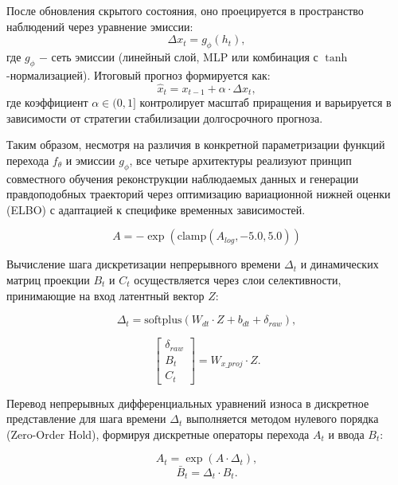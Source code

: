 \documentclass[14pt, a4paper, oneside]{extreport}
\begin{document}
После обновления скрытого состояния, оно проецируется в пространство наблюдений через уравнение эмиссии:
\begin{equation}
\Delta x_t = g_{\phi}(h_t),
\end{equation}
где $g_{\phi}$ $-$ сеть эмиссии (линейный слой, MLP или комбинация с $\tanh$-нормализацией). Итоговый прогноз формируется как:
\begin{equation}
\hat{x}_t = x_{t-1} + \alpha \cdot \Delta x_t,
\end{equation}
где коэффициент $\alpha \in (0, 1]$ контролирует масштаб приращения и варьируется в зависимости от стратегии стабилизации долгосрочного прогноза.

Таким образом, несмотря на различия в конкретной параметризации функций перехода $f_{\theta}$ и эмиссии $g_{\phi}$, все четыре архитектуры реализуют принцип совместного обучения реконструкции наблюдаемых данных и генерации правдоподобных траекторий через оптимизацию вариационной нижней оценки (ELBO) с адаптацией к специфике временных зависимостей.

\begin{equation}
A = - \exp\left(\text{clamp}(A_{log}, -5.0, 5.0)\right)
\end{equation}

Вычисление шага дискретизации непрерывного времени $\Delta_t$ и динамических матриц проекции $B_t$ и $C_t$ осуществляется через слои селективности, принимающие на вход латентный вектор $Z$:

\begin{equation}
\Delta_t = \text{softplus}\left(W_{dt} \cdot Z + b_{dt} + \delta_{raw}\right),
\end{equation}

\begin{equation}
\begin{bmatrix} \delta_{raw} \\ B_t \\ C_t \end{bmatrix} = W_{x\_proj} \cdot Z.
\end{equation}

Перевод непрерывных дифференциальных уравнений износа в дискретное представление для шага времени $\Delta_t$ выполняется методом нулевого порядка (Zero-Order Hold), формируя дискретные операторы перехода $A_t$ и ввода $B_t$:

\begin{equation}
A_t = \exp\left(A \cdot \Delta_t\right),
\end{equation}
\begin{equation}
\bar{B}_t = \Delta_t \cdot B_t.
\end{equation}
\end{document}
